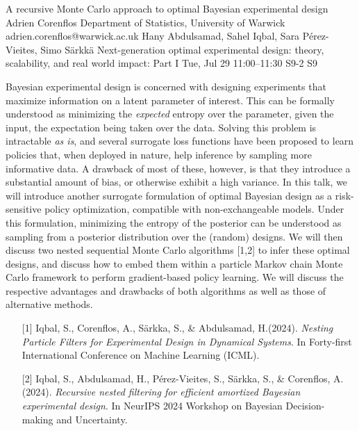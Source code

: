 \begin{talk}
  {A recursive Monte Carlo approach to optimal Bayesian experimental design}%
  {Adrien Corenflos}%
  {Department of Statistics, University of Warwick}%
  {adrien.corenflos@warwick.ac.uk}%
  {Hany Abdulsamad, Sahel Iqbal, Sara P\'erez-Vieites, Simo Särkkä}%
  {Next-generation optimal experimental design: theory, scalability, and real world impact: Part I}%
  {Tue, Jul 29 11:00–11:30}%
  {S9-2}%
  {S9}%
				
			
    Bayesian experimental design is concerned with designing experiments that maximize information on a latent parameter of interest. 
    This can be formally understood as minimizing the \emph{expected} entropy over the parameter, given the input, the expectation being taken over the data.
    Solving this problem is intractable \emph{as is}, and several surrogate loss functions have been proposed to learn policies that, when deployed in nature, help inference by sampling more informative data.
    A drawback of most of these, however, is that they introduce a substantial amount of bias, or otherwise exhibit a high variance.
    In this talk, we will introduce another surrogate formulation of optimal Bayesian design as a risk-sensitive policy optimization, compatible with non-exchangeable models.
    Under this formulation, minimizing the entropy of the posterior can be understood as sampling from a posterior distribution over the (random) designs.
    We will then discuss two nested sequential Monte Carlo algorithms [1,2] to infer these optimal designs, and discuss how to embed them within a particle Markov chain Monte Carlo framework to perform gradient-based policy learning. 
    We will discuss the respective advantages and drawbacks of both algorithms as well as those of alternative methods.
\medskip


\begin{enumerate}
	\item[{[1]}]Iqbal, S., Corenflos, A., Särkka, S., \&  Abdulsamad, H.(2024). {\it Nesting Particle Filters for Experimental Design in Dynamical Systems}. In Forty-first International Conference on Machine Learning (ICML).
	\item[{[2]}] Iqbal, S., Abdulsamad, H., Pérez-Vieites, S., Särkka, S., \& Corenflos, A. (2024). {\it Recursive nested filtering for efficient amortized Bayesian experimental design}. In NeurIPS 2024 Workshop on Bayesian Decision-making and Uncertainty.
\end{enumerate}

\end{talk}

